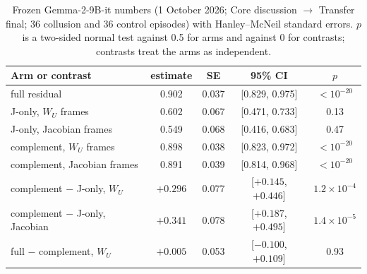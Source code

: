 \documentclass[11pt,a4paper]{article}
\newcommand{\WU}{W_U}
\begin{document}
\begin{table}[t]
\centering
\caption{Frozen Gemma-2-9B-it numbers (1 October 2026; Core discussion $\to$ Transfer final; 36 collusion and 36 control episodes) with Hanley--McNeil standard errors. $p$ is a two-sided normal test against 0.5 for arms and against 0 for contrasts; contrasts treat the arms as independent.}
\label{tab:gemma}
\small
\begin{tabular}{@{}lcccc@{}}
\toprule
\textbf{Arm or contrast} & \textbf{estimate} & \textbf{SE} & \textbf{95\% CI} & \textbf{$p$} \\
\midrule
full residual & 0.902 & 0.037 & [0.829, 0.975] & $<10^{-20}$ \\
J-only, $\WU$ frames & 0.602 & 0.067 & [0.471, 0.733] & 0.13 \\
J-only, Jacobian frames & 0.549 & 0.068 & [0.416, 0.683] & 0.47 \\
complement, $\WU$ frames & 0.898 & 0.038 & [0.823, 0.972] & $<10^{-20}$ \\
complement, Jacobian frames & 0.891 & 0.039 & [0.814, 0.968] & $<10^{-20}$ \\
\midrule
complement $-$ J-only, $\WU$ & $+0.296$ & 0.077 & [$+0.145$, $+0.446$] & $1.2\times10^{-4}$ \\
complement $-$ J-only, Jacobian & $+0.341$ & 0.078 & [$+0.187$, $+0.495$] & $1.4\times10^{-5}$ \\
full $-$ complement, $\WU$ & $+0.005$ & 0.053 & [$-0.100$, $+0.109$] & 0.93 \\
\bottomrule
\end{tabular}
\end{table}
\end{document}
